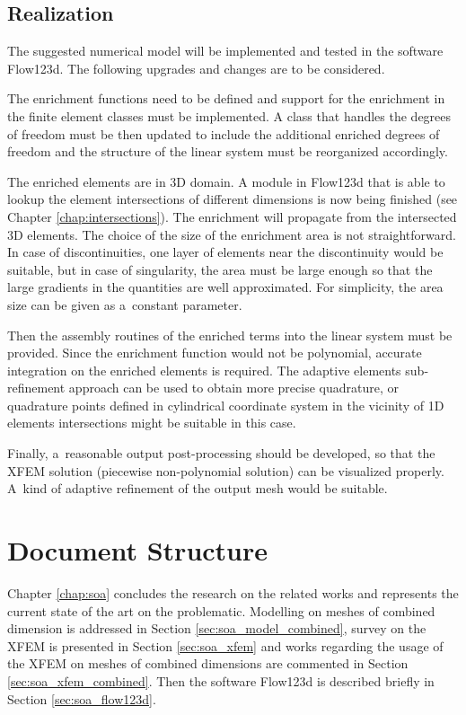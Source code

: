 \documentclass[bibliography=totocnumbered,dvipsnames,FM,Dis]{tulthesis_autoreferat}
\begin{document}
\subsection{Realization} \label{sec:realization}
The suggested numerical model will be implemented and tested in the software Flow123d.
The following upgrades and changes are to be considered.

The enrichment functions need to be defined and support for the enrichment in the finite element classes must be implemented. 
A class that handles the degrees of freedom must be then updated to include the additional enriched degrees of freedom
and the structure of the linear system must be reorganized accordingly.

The enriched elements are in 3D domain. A module in Flow123d that is able to lookup the element intersections
of different dimensions is now being finished (see Chapter \ref{chap:intersections}). The enrichment will propagate from the intersected 3D elements.
The choice of the size of the enrichment area is not straightforward. In case of discontinuities, one layer of elements
near the discontinuity would be suitable, but in case of singularity, the area must be large enough so that 
the large gradients in the quantities are well approximated. For simplicity, the area size can be given as
a~constant parameter.

Then the assembly routines of the enriched terms into the linear system must be provided.
Since the enrichment function would not be polynomial, accurate integration on the enriched elements is required. 
The adaptive elements sub-refinement approach can be used to obtain more precise quadrature, 
or quadrature points defined in cylindrical coordinate system in the vicinity of 1D elements intersections
might be suitable in this case.

Finally, a~reasonable output post-processing should be developed, so that the XFEM solution (piecewise non-polynomial solution)
can be visualized properly. A~kind of adaptive refinement of the output mesh would be suitable.


\section{Document Structure} \label{sec:structure}

Chapter \ref{chap:soa} concludes the research on the related works and represents the current state of the art
on the problematic. Modelling on meshes of combined dimension is addressed in Section \ref{sec:soa_model_combined},
survey on the XFEM is presented in Section \ref{sec:soa_xfem} and works regarding the usage of the XFEM on
meshes of combined dimensions are commented in Section \ref{sec:soa_xfem_combined}. Then 
the software Flow123d is described briefly in Section \ref{sec:soa_flow123d}.
\end{document}
